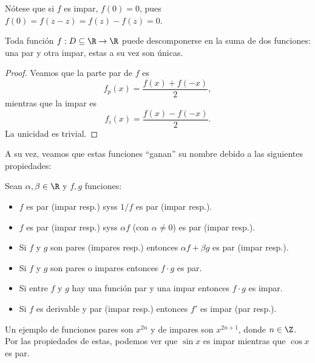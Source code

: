 \documentclass[11pt,oneside,a4paper]{book}
\begin{document}
Nótese que si $f$ es impar, $f(0)=0$, pues $f(0)=f(z-z)=f(z)-f(z)=0$.
\begin{thm}
Toda función $f:D\subseteq\R\rightarrow\R$ puede descomponerse en la suma de dos funciones: una par y otra impar, estas a su vez son únicas.
\end{thm}
\begin{proof}
Veamos que la parte par de $f$ es
$$f_p(x)=\frac{f(x)+f(-x)}{2},$$
mientras que la impar es
$$f_i(x)=\frac{f(x)-f(-x)}{2}.$$
La unicidad es trivial.
\end{proof}
A su vez, veamos que estas funciones ``ganan'' su nombre debido a las siguientes propiedades:
\begin{prop}
Sean $\alpha,\beta\in\R$ y $f,g$ funciones:
\begin{itemize}
\item $f$ es par (impar resp.) syss $1/f$ es par (impar resp.).
\item $f$ es par (impar resp.) syss $\alpha f$ (con $\alpha\neq 0$) es par (impar resp.).
\item Si $f$ y $g$ son pares (impares resp.) entonces $\alpha f+\beta g$ es par (impar resp.).
\item Si $f$ y $g$ son pares o impares entonces $f\cdot g$ es par.
\item Si entre $f$ y $g$ hay una función par y una impar entonces $f\cdot g$ es impar.
\item Si $f$ es derivable y par (impar resp.) entonces $f'$ es impar (par resp.).
\end{itemize}
\end{prop}
Un ejemplo de funciones pares son $x^{2n}$ y de impares son $x^{2n+1}$, donde $n\in\Z$. Por las propiedades de estas, podemos ver que $\sin x$ es impar mientras que $\cos x$ es par.
\end{document}
